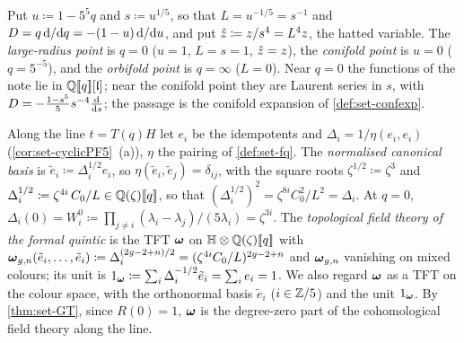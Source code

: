 \begin{defn}
\label{def:set-points}
Put $u\coloneqq1-5^5q$ and $s\coloneqq u^{1/5}$, so that $L=u^{-1/5}=s^{-1}$ and $D=q\,\mathrm{d}/\mathrm{d} q=-(1-u)\,\mathrm{d}/\mathrm{d} u$, and put $\hat{z}\coloneqq z/s^4=L^4z$, the hatted variable. The \emph{large-radius point} is $q=0$ ($u=1$, $L=s=1$, $\hat{z}=z$), the \emph{conifold point} is $u=0$ ($q=5^{-5}$), and the \emph{orbifold point} is $q=\infty$ ($L=0$). Near $q=0$ the functions of the note lie in $\mathbb{Q}[\![ q ]\!][\mathfrak{l}]$; near the conifold point they are Laurent series in $s$, with $D=-\frac{1-s^5}5s^{-4}\frac{\mathrm{d}}{\mathrm{d} s}$; the passage is the conifold expansion of \cref{def:set-confexp}.
\end{defn}

\begin{defn}
\label{def:set-frob}
Along the line $t=T(q)H$ let $e_i$ be the idempotents and $\Delta_i=1/\eta(e_i,e_i)$ (\cref{cor:set-cyclicPF5}~(a)), $\eta$ the pairing of \cref{def:set-fq}. The \emph{normalised canonical basis} is $\tilde e_i\coloneqq\Delta_i^{1/2}e_i$, so $\eta(\tilde e_i,\tilde e_j)=\delta_{ij}$, with the square roots $\zeta^{1/2}\coloneqq\zeta^3$ and $\Delta_i^{1/2}\coloneqq\zeta^{4i}\,C_0/L\in\mathbb{Q}(\zeta)[\![ q ]\!]$, so that $(\Delta_i^{1/2})^2=\zeta^{8i}C_0^2/L^2=\Delta_i$. At $q=0$, $\Delta_i(0)=W^0_i\coloneqq\prod_{j\neq i}(\lambda_i-\lambda_j)/(5\lambda_i)=\zeta^{3i}$. The \emph{topological field theory of the formal quintic} is the TFT $\boldsymbol{\omega}$ on $\mathbb{H}\otimes\mathbb{Q}(\zeta)[\![ q ]\!]$ with $\boldsymbol{\omega}_{g,n}(\tilde e_i,\dots,\tilde e_i)\coloneqq\Delta_i^{(2g-2+n)/2}=(\zeta^{4i}C_0/L)^{2g-2+n}$ and $\boldsymbol{\omega}_{g,n}$ vanishing on mixed colours; its unit is $1_{\boldsymbol{\omega}}\coloneqq\sum_i\Delta_i^{-1/2}\tilde e_i=\sum_ie_i=1$. We also regard $\boldsymbol{\omega}$ as a TFT on the colour space, with the orthonormal basis $\tilde e_i$ ($i\in\mathbb{Z}/5$) and the unit $1_{\boldsymbol{\omega}}$. By \cref{thm:set-GT}, since $R(0)=1$, $\boldsymbol{\omega}$ is the degree-zero part of the cohomological field theory along the line.
\end{defn}


